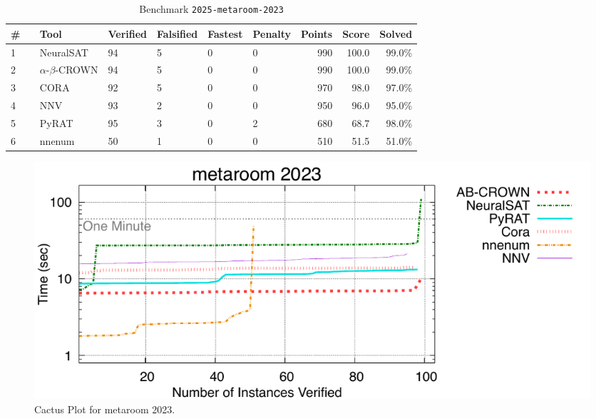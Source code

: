 \begin{table}[h]
\begin{center}
\caption{Benchmark \texttt{2025-metaroom-2023}} \label{tab:cat_2025_metaroom_2023}
{\setlength{\tabcolsep}{2pt}
\begin{tabular}[h]{@{}llllllrrr@{}}
\toprule
\textbf{\# ~} & \textbf{Tool} & \textbf{Verified} & \textbf{Falsified} & \textbf{Fastest} & \textbf{Penalty} & \textbf{Points} & \textbf{Score} & \textbf{Solved}\\
\midrule
1 & NeuralSAT & 94 & 5 & 0 & 0 & 990 & 100.0 & 99.0\% \\
2 & $\alpha$-$\beta$-CROWN & 94 & 5 & 0 & 0 & 990 & 100.0 & 99.0\% \\
3 & CORA & 92 & 5 & 0 & 0 & 970 & 98.0 & 97.0\% \\
4 & NNV & 93 & 2 & 0 & 0 & 950 & 96.0 & 95.0\% \\
5 & PyRAT & 95 & 3 & 0 & 2 & 680 & 68.7 & 98.0\% \\
6 & nnenum & 50 & 1 & 0 & 0 & 510 & 51.5 & 51.0\% \\
\bottomrule
\end{tabular}
}
\end{center}
\end{table}



\begin{figure}[h]
\centerline{\includegraphics[width=\textwidth]{cactus/2025_metaroom_2023.pdf}}
\caption{Cactus Plot for metaroom 2023.}
\label{fig:quantPic}
\end{figure}


\clearpage

